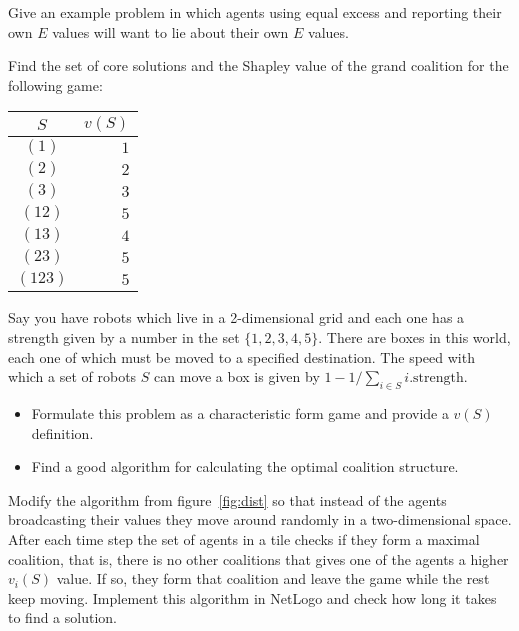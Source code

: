 \begin{exercises}

\item Give an example problem in which agents using equal excess and
  reporting their own $E$ values will want to lie about their own $E$
  values.

\item Find the set of core solutions and the Shapley value of the
  grand coalition for the following game:
  \begin{tabular}{cr} \toprule
          $S$ & $v(S)$ \\ \midrule
          $(1)$ & \emph{$1$} \\ 
          $(2)$ & \emph{$2$}\\ 
          $(3)$ & \emph{$3$}\\ 
          $(12)$& \emph{$5$}\\ 
          $(13)$& \emph{$4$}\\ 
          $(23)$& \emph{$5$}\\ 
          $(123)$& \emph{$5$}\\ \bottomrule
        \end{tabular}


\item Say you have robots which live in a 2-dimensional grid and each
  one has a strength given by a number in the set $\{1,2,3,4,5\}$.
  There are boxes in this world, each one of which must be moved to a
  specified destination. The speed with which a set of robots $S$ can
  move a box is given by $1 - 1/\sum_{i \in S} i.\text{strength}$.
  \begin{itemize}
  \item Formulate this problem as a characteristic form game and
    provide a $v(S)$ definition.
  \item Find a good algorithm for calculating the optimal coalition
    structure.
  \end{itemize}

\item Modify the  algorithm from
  figure~\ref{fig:dist} so that instead of the agents broadcasting
  their values they move around randomly in a two-dimensional space.
  After each time step the set of agents in a tile checks if they form
  a maximal coalition, that is, there is no other coalitions that
  gives one of the agents a higher $v_i(S)$ value. If so, they form
  that coalition and leave the game while the rest keep moving.
  Implement this algorithm in NetLogo and check how long it takes to
  find a solution.



\end{exercises}
